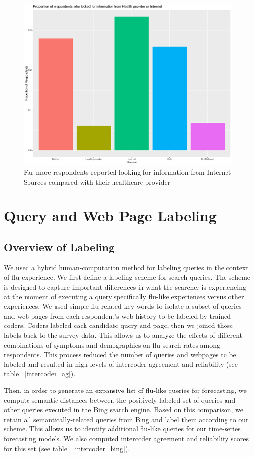 \documentclass[12pt]{article}
\begin{document}
\begin{figure}[!htbp]
\begin{centering}
   \includegraphics[width=.6\textwidth]{info_source.pdf}
  \caption{Far more respondents reported looking for information from Internet Sources compared with their healthcare provider}
\label{info_source}
\end{centering}
\end{figure}


\section{Query and Web Page Labeling}

\subsection{Overview of Labeling}
We used a hybrid human-computation method for labeling queries in the context of flu experience. We first define a labeling scheme for search queries. The scheme is designed to capture important differences in what the searcher is experiencing at the moment of executing a query|specifically flu-like experiences versus other experiences. 
We used simple flu-related key words to isolate a subset of queries and web pages from each respondent's web history to be labeled by trained coders. Coders labeled each candidate query and page, then we joined those labels back to the survey data. This allows us to analyze the effects of different combinations of symptoms and demographics on flu search rates among respondents. This process reduced the number of queries and webpages to be labeled and resulted in high levels of intercoder agreement and reliability (see table ~\ref{intercoder_ag}).

Then, in order to generate an expansive list of flu-like queries for forecasting, we compute semantic distances between the positively-labeled set of queries and other queries executed in the Bing search engine. Based on this comparison, we retain all semantically-related queries from Bing and label them according to our scheme. This allows us to identify additional flu-like queries for our time-series forecasting models. We also computed intercoder agreement and reliability scores for this set (see table ~\ref{intercoder_bing}). 
\end{document}
